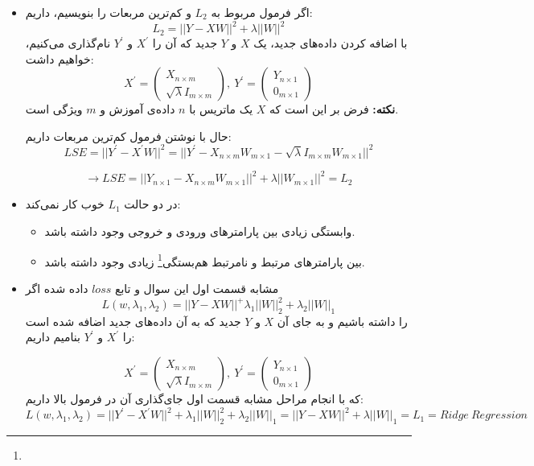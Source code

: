 
\begin{itemize}
	\item 
	اگر فرمول مربوط به $L_2$ و کم‌ترین مربعات را بنویسیم، داریم:
	$$
	L_2 = ||Y - XW||^2 + \lambda ||W||^2
	$$
	با اضافه کردن داده‌های جدید، یک $X$ و $Y$ جدید که آن را $X^\prime$ و $Y^\prime$ نام‌گذاری می‌کنیم، خواهیم داشت:
	$$
	X^\prime = \begin{pmatrix}
	X_{n \times m}\\
	\sqrt{\lambda} I_{m \times m}
	\end{pmatrix}, \: Y^\prime = \begin{pmatrix}
	Y_{n \times 1}\\
	0_{m \times 1}
	\end{pmatrix}
	$$
	\textbf{نکته:} فرض بر این است که $X$ یک ماتریس با $n$ داده‌ی آموزش و $m$ ویژگی است.
	
	حال با نوشتن فرمول کم‌ترین مربعات داریم:
	$$
	LSE = ||Y^\prime - X^\prime W||^2 = ||Y^\prime - X_{n\times m}W_{m\times 1} - \sqrt{\lambda} I_{m \times m} W_{m \times 1}||^2
	$$
	
	$$
	\rightarrow LSE = ||Y_{n \times 1} - X_{n\times m} W_{m \times 1} ||^2 + \lambda ||W_{m \times 1}||^2 = L_2
	$$
	
	\item در دو حالت $L_1$ خوب کار نمی‌کند:
	\begin{itemize}
		\item وابستگی زیادی بین پارامترهای ورودی و خروجی وجود داشته باشد.
		\item بین پارامتر‌های مرتبط و نامرتبط هم‌بستگی\footnote{} زیادی وجود داشته باشد.
	\end{itemize}
\item مشابه قسمت اول این سوال و تابع $loss$ داده شده اگر 
$$
L(w, \lambda_1, \lambda_2) = ||Y - XW||^ + \lambda_1||W||_2^2 + \lambda_2 ||W||_1
$$
را داشته باشیم و به جای آن $X$ و $Y$ جدید که به آن داده‌های جدید اضافه شده است را $X^\prime$ و $Y^\prime$ بنامیم داریم:

	$$
X^\prime = \begin{pmatrix}
X_{n \times m}\\
\sqrt{\lambda} I_{m \times m}
\end{pmatrix}, \: Y^\prime = \begin{pmatrix}
Y_{n \times 1}\\
0_{m \times 1}
\end{pmatrix}
$$ 
که با انجام مراحل مشابه قسمت اول جای‌گذاری آن در فرمول بالا داریم:
$$
L(w, \lambda_1, \lambda_2) = ||Y^\prime - X^\prime W||^2 + \lambda_1 ||W||_2^2 + \lambda_2 ||W||_1 = ||Y - XW||^2 + \lambda ||W||_1 = L_1 = Ridge \: Regression
$$
\end{itemize}